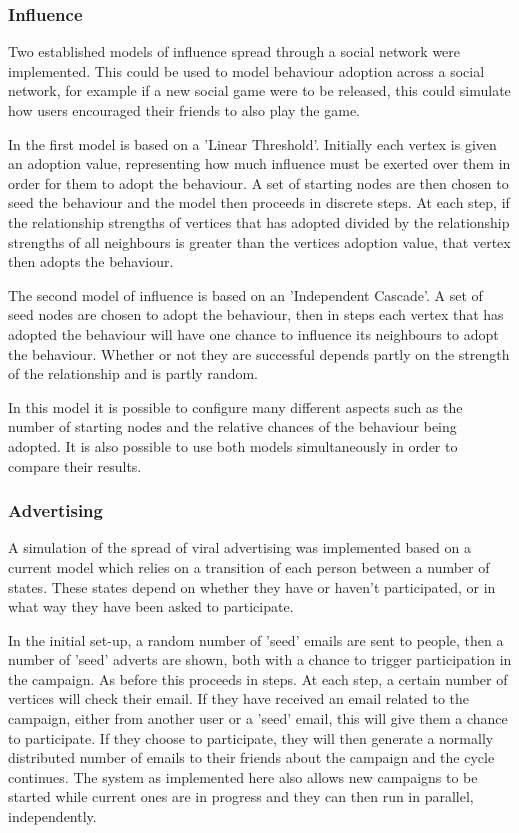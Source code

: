 \documentclass[12pt,a4paper]{article}
\begin{document}
\subsubsection{Influence}

Two established models of influence spread through a social network \cite{kempe2003maximizing} were implemented. This could be used to model behaviour adoption across a social network, for example if a new social game were to be released, this could simulate how users encouraged their friends to also play the game.

In the first model is based on a 'Linear Threshold'. Initially each vertex is given an adoption value, representing how much influence must be exerted over them in order for them to adopt the behaviour. A set of starting nodes are then chosen to seed the behaviour and the model then proceeds in discrete steps. At each step, if the relationship strengths of vertices that has adopted divided by the relationship strengths of all neighbours is greater than the vertices adoption value, that vertex then adopts the behaviour.

The second model of influence is based on an 'Independent Cascade'. A set of seed nodes are chosen to adopt the behaviour, then in steps each vertex that has adopted the behaviour will have one chance to influence its neighbours to adopt the behaviour. Whether or not they are successful depends partly on the strength of the relationship and is partly random.

In this model it is possible to configure many different aspects such as the number of starting nodes and the relative chances of the behaviour being adopted. It is also possible to use both models simultaneously in order to compare their results.

\subsubsection{Advertising}

A simulation of the spread of viral advertising was implemented based on a current model \cite{van2010viral} which relies on a transition of each person between a number of states. These states depend on whether they have or haven’t participated, or in what way they have been asked to participate.

In the initial set-up, a random number of 'seed' emails are sent to people, then a number of 'seed' adverts are shown, both with a chance to trigger participation in the campaign. As before this proceeds in steps. At each step, a certain number of vertices will check their email. If they have received an email related to the campaign, either from another user or a 'seed' email, this will give them a chance to participate. If they choose to participate, they will then generate a normally distributed number of emails to their friends about the campaign and the cycle continues. The system as implemented here also allows new campaigns to be started while current ones are in progress and they can then run in parallel, independently.
\end{document}
